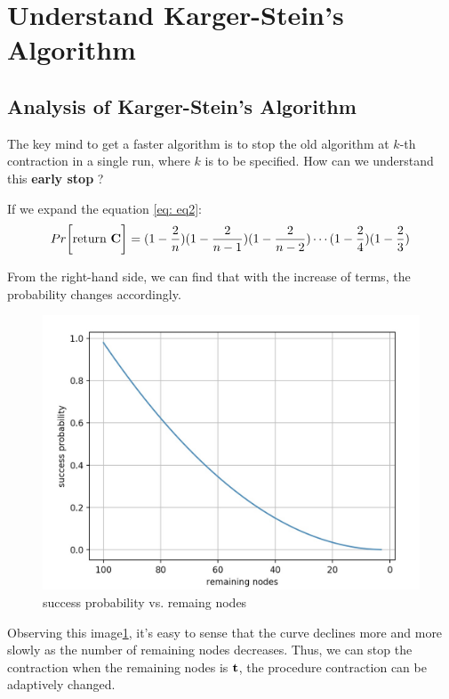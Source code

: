 \documentclass[a4paper, 12pt, titlepage]{article}
\begin{document}
\section{Understand Karger-Stein's Algorithm}

\subsection{Analysis of Karger-Stein's Algorithm}
The key mind to get a faster algorithm is to stop the old algorithm at $k$-th contraction in a single run, where $k$ is to be specified.
How can we understand this \textbf{early stop} ? 

If we expand the equation \ref{eq: eq2}:
\begin{equation}\label{eq: eq4}
    Pr \bigg[ \text{return \textbf{C}} \bigg] = (1 - \frac{2}{n})(1 - \frac{2}{n - 1})(1 - \frac{2}{n - 2}) \cdots (1- \frac{2}{4})(1 - \frac{2}{3})
\end{equation}

From the right-hand side, we can find that with the increase of terms, the probability changes accordingly.
\begin{figure}[h]\label{fig: fig1}
    \centering
    \includegraphics[scale=0.3]{images/min-cut-pic1.png}
    \caption{success probability vs. remaing nodes}
    \label{fig:fig1}
\end{figure}

Observing this image\ref{fig:fig1}, it's easy to sense that the curve declines more and more slowly as the number of remaining nodes decreases.
Thus, we can stop the contraction when the remaining nodes is ${\bf t}$, the procedure contraction can be adaptively changed.
\end{document}
